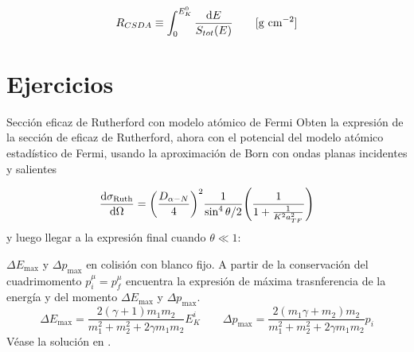 \begin{equation}
    R_{CSDA} \equiv \int_{0}^{E_K^0} \frac{\D E }{S_{tot}(E) } \qquad [\unit{g \ cm^{-2}}]
\end{equation}



\section*{Ejercicios}




\begin{Ejercicio}{Sección eficaz de Rutherford con modelo atómico de Fermi} \label{Ej:02.01}
    Obten la expresión de la sección de eficaz de Rutherford, ahora con el potencial del modelo atómico estadístico de Fermi, usando la aproximación de Born con ondas planas incidentes y salientes

    \begin{equation*}
        \dv{\sigma_{\Ruth}}{\Omega} =  \pqty{\frac{D_{\alpha-N}}{4}}^2 \frac{1}{\sin^4 \theta/2} \pqty{\frac{1}{1+\frac{1}{K^2 a_{TF}^2}}}
    \end{equation*}
    y luego llegar a la expresión final cuando $\theta\ll 1$: 
\end{Ejercicio}

\begin{Ejercicio}{$\Delta E_{\max}$ y $\Delta p_{\max}$ en colisión con blanco fijo.} \label{Ej:02.02}
    A partir de la conservación del cuadrimomento $p^{\mu}_i = p^{\mu}_f$ encuentra la expresión de máxima trasnferencia de la energía y del momento $\Delta E_{\max}$ y $\Delta p_{\max}$. 
    \begin{equation}
        \Delta E_{\max} = \frac{2(\gamma+1)m_1m_2}{m_1^2 + m_2^2 + 2 \gamma m_1 m_2} E_K^i \qquad 
        \Delta p_{\max} = \frac{2(m_1\gamma+m_2)m_2}{m_1^2 + m_2^2 + 2 \gamma m_1 m_2} p_i 
    \end{equation}
    Véase la solución en \cite{Montaruli201x_Exercise4}.
\end{Ejercicio}

